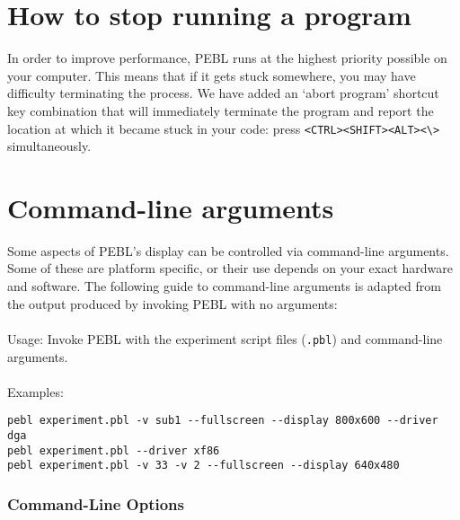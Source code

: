 \section{How to stop running a program}

In order to improve performance, PEBL runs at the highest
priority possible on your computer.  This means that if it
gets stuck somewhere, you may have difficulty terminating the
process.  We have added an `abort program' shortcut key
combination that will immediately terminate the program and
report the location at which it became stuck in your code: \newline press \verb+<CTRL><SHIFT><ALT><\>+ simultaneously.
  

\section{Command-line arguments}
\label{sec:2.5}
Some aspects of PEBL's display can be controlled via
command-line arguments.  Some of these are platform
specific, or their use depends on your exact hardware and
software. The following guide to command-line
arguments is adapted from the output produced by
invoking PEBL  with no arguments:\\
\\
Usage:  Invoke PEBL with the experiment script files (\texttt{.pbl})
and  command-line arguments.\\
\\
Examples:
\begin{verbatim}
pebl experiment.pbl -v sub1 --fullscreen --display 800x600 --driver dga
pebl experiment.pbl --driver xf86
pebl experiment.pbl -v 33 -v 2 --fullscreen --display 640x480 
\end{verbatim}
 

\subsubsection{Command-Line Options}

